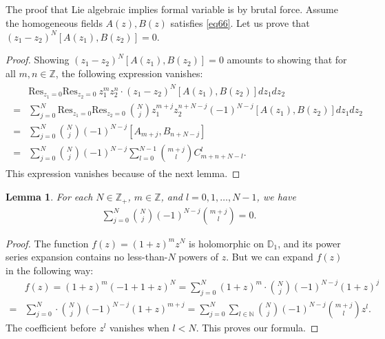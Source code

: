 \documentclass[12pt,a4paper,notitlepage]{article}
\theoremstyle{definition}
\theoremstyle{plain}
\newtheorem{lm}[df]{Lemma}
\newcommand{\Res}{\mathrm{Res}}
\newcommand{\Nbb}{\mathbb N}
\newcommand{\Zbb}{\mathbb Z}
\newcommand{\Dbb}{\mathbb D}
\numberwithin{equation}{section}
\begin{document}
\subsection{}\label{lb67}

The proof that Lie algebraic implies formal variable is by brutal force. Assume the homogeneous fields $A(z),B(z)$ satisfies \eqref{eq66}. Let us prove that $(z_1-z_2)^N[A(z_1),B(z_2)]=0$.

\begin{proof}
Showing $(z_1-z_2)^N[A(z_1),B(z_2)]=0$ amounts to showing that  for all $m,n\in\Zbb$, the following expression vanishes:
\begin{align}\label{eq102}
\begin{aligned}
&\Res_{z_1=0}\Res_{z_2=0}~z_1^mz_2^n\cdot (z_1-z_2)^N[A(z_1),B(z_2)]dz_1dz_2\\
=&\sum_{j=0}^N \Res_{z_1=0}\Res_{z_2=0}~{N\choose j}z_1^{m+j}z_2^{n+N-j}(-1)^{N-j}[A(z_1),B(z_2)]dz_1dz_2\\
=&\sum_{j=0}^N{N\choose j}(-1)^{N-j}[A_{m+j},B_{n+N-j}]\\
=&\sum_{j=0}^N{N\choose j}(-1)^{N-j}\sum_{l=0}^{N-1}{m+j\choose l}C^l_{m+n+N-l}.	
\end{aligned}
\end{align}
This expression vanishes because of  the next lemma.
\end{proof}


\begin{lm}
For each $N\in\Zbb_+$, $m\in\Zbb$, and  $l=0,1,\dots,N-1$, we have
\begin{align*}
\sum_{j=0}^N{N\choose j}(-1)^{N-j}{m+j\choose l}=0.	
\end{align*}
\end{lm}

\begin{proof}
The function $f(z)=(1+z)^mz^N$ is holomorphic on $\Dbb_1$, and its power series expansion contains no less-than-$N$ powers of $z$. But we can expand $f(z)$ in the following way:
\begin{align*}
&f(z)=(1+z)^m(-1+1+z)^N=\sum_{j=0}^N(1+z)^m\cdot{N\choose j} (-1)^{N-j}(1+z)^j\\
=&	\sum_{j=0}^N \cdot{N\choose j}(-1)^{N-j}(1+z)^{m+j}=\sum_{j=0}^N\sum_{l\in\Nbb} {N\choose j}(-1)^{N-j}{m+j\choose l}z^l.
\end{align*}
The coefficient before $z^l$ vanishes when $l<N$. This proves our formula.
\end{proof}
\end{document}
